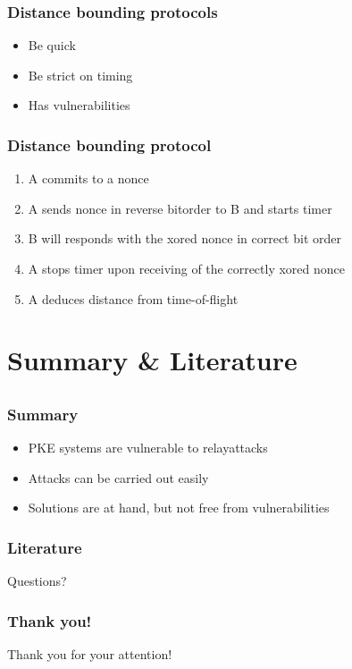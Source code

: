 \documentclass[12pt]{beamer}
\begin{document}
	\begin{frame}
		\frametitle{Distance bounding protocols}
			\begin{itemize}
				\item Be quick
				\item Be strict on timing
				\item Has vulnerabilities
			\end{itemize}
	\end{frame}

	\begin{frame}
		\frametitle{Distance bounding protocol}
			\begin{enumerate}
				\item A commits to a nonce
				\item A sends nonce in reverse bitorder to B and starts timer
				\item B will responds with the xored nonce in correct bit order
				\item A stops timer upon receiving of the correctly xored nonce
				\item A deduces distance from time-of-flight
			\end{enumerate}
	\end{frame}

\section{Summary \& Literature}
\subsection*{}
	\begin{frame}
		\frametitle{Summary}
			\begin{itemize}
				\item PKE systems are vulnerable to relayattacks 
				\item Attacks can be carried out easily
				\item Solutions are at hand, but not free from vulnerabilities
			\end{itemize}
	\end{frame}
	\begin{frame}
	\frametitle{Literature}
	\tiny
	\nocite{*}
		\def\newblock{}
		
		
	\end{frame}
	
	\begin{frame}
		\begin{center}
			Questions?
		\end{center}
	\end{frame}	

	\begin{frame}
		\frametitle{Thank you!}
		\begin{center}
			Thank you for your attention!
		\end{center}
	\end{frame}	
\end{document}
